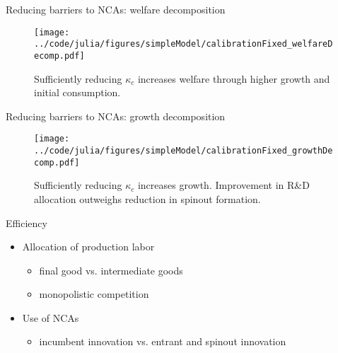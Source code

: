 \documentclass[english,usenames,dvipsnames]{beamer}
\begin{document}
\begin{frame}{Reducing barriers to NCAs: welfare decomposition} \label{plots:reducing_kappa_c1} 
	\hyperlink{reducing_kappa_c_table}{}
	\begin{figure}[]
		\texttt{[image: ../code/julia/figures/simpleModel/calibrationFixed\_welfareDecomp.pdf]}
		\caption{Sufficiently reducing $\kappa_c$ increases welfare through higher growth and initial consumption.}
	\end{figure}
\end{frame}

\begin{frame}{Reducing barriers to NCAs: growth decomposition} \label{plots:reducing_kappa_c2} 
	\hyperlink{reducing_kappa_c_table}{}
	\begin{figure}[]
		\texttt{[image: ../code/julia/figures/simpleModel/calibrationFixed\_growthDecomp.pdf]}
		\caption{Sufficiently reducing $\kappa_c$ increases growth. Improvement in R\&D allocation outweighs reduction in spinout formation.}
	\end{figure}
\end{frame}


\begin{frame}{Efficiency}\label{efficiency} 
	\hyperlink{reducing_kappa_c_table}{}
	\medskip
	\begin{itemize}
		\item Allocation of production labor
		\begin{itemize}
			\item final good vs. intermediate goods
			\item monopolistic competition
		\end{itemize}
		\medskip
		\item Use of NCAs 
		\begin{itemize}
			\item incumbent innovation vs. entrant and spinout innovation  \hyperlink{misallocation_of_nca}{} 
		\end{itemize}
	\end{itemize}
\end{frame}
\end{document}
